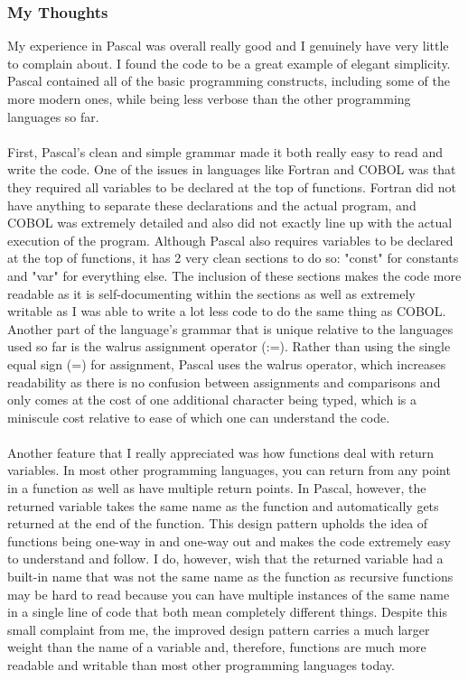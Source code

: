 \documentclass[letterpaper, 10pt, DIV=13]{scrartcl}
\numberwithin{equation}{section}
\numberwithin{figure}{section}
\numberwithin{table}{section}
\begin{document}
\subsubsection{My Thoughts}
My experience in Pascal was overall really good and I genuinely have very little to complain about. I found the code to be a great example of elegant simplicity. Pascal contained all of the basic programming constructs, including some of the more modern ones, while being less verbose than the other programming languages so far.
\\ \\
First, Pascal's clean and simple grammar made it both really easy to read and write the code. One of the issues in languages like Fortran and COBOL was that they required all variables to be declared at the top of functions. Fortran did not have anything to separate these declarations and the actual program, and COBOL was extremely detailed and also did not exactly line up with the actual execution of the program. Although Pascal also requires variables to be declared at the top of functions, it has 2 very clean sections to do so: "const" for constants and "var" for everything else. The inclusion of these sections makes the code more readable as it is self-documenting within the sections as well as extremely writable as I was able to write a lot less code to do the same thing as COBOL. Another part of the language's grammar that is unique relative to the languages used so far is the walrus assignment operator (:=). Rather than using the single equal sign (=) for assignment, Pascal uses the walrus operator, which increases readability as there is no confusion between assignments and comparisons and only comes at the cost of one additional character being typed, which is a miniscule cost relative to ease of which one can understand the code.
\\ \\
Another feature that I really appreciated was how functions deal with return variables. In most other programming languages, you can return from any point in a function as well as have multiple return points. In Pascal, however, the returned variable takes the same name as the function and automatically gets returned at the end of the function. This design pattern upholds the idea of functions being one-way in and one-way out and makes the code extremely easy to understand and follow. I do, however, wish that the returned variable had a built-in name that was not the same name as the function as recursive functions may be hard to read because you can have multiple instances of the same name in a single line of code that both mean completely different things. Despite this small complaint from me, the improved design pattern carries a much larger weight than the name of a variable and, therefore, functions are much more readable and writable than most other programming languages today.
\end{document}
